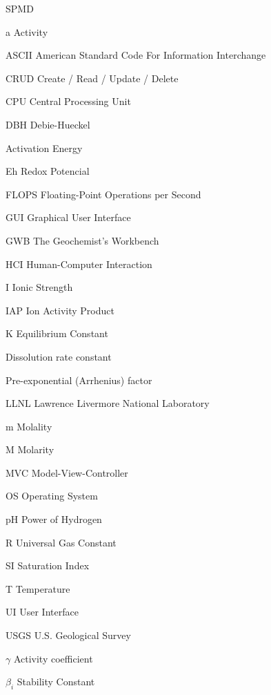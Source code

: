 \documentclass[ppgc,mestrado,english]{iiufrgs}
\begin{document}
\begin{listofabbrv}{SPMD}
\item[a] Activity
\item[ASCII] American Standard Code For Information Interchange
\item[CRUD] Create / Read / Update / Delete
\item[CPU] Central Processing Unit
\item[DBH] Debie-Hueckel 
\item[\ce{E_a}] Activation Energy
\item[Eh] Redox Potencial
\item[FLOPS] Floating-Point Operations per Second
\item[GUI] Graphical User Interface
\item[GWB] The Geochemist's Workbench
\item[HCI] Human-Computer Interaction        
\item[I] Ionic Strength
\item[IAP] Ion Activity Product 
\item[K] Equilibrium Constant        
\item[\ce{k_{diss}}] Dissolution rate constant
\item[\ce{k_0}] Pre-exponential (Arrhenius) factor
\item[LLNL] Lawrence Livermore National Laboratory
\item[m] Molality
\item[M] Molarity
\item[MVC] Model-View-Controller
\item[OS] Operating System
\item[pH] Power of Hydrogen
\item[R] Universal Gas Constant
\item[SI] Saturation Index 
\item[T] Temperature
\item[UI] User Interface
\item[USGS] U.S. Geological Survey
\item[$\gamma$] Activity coefficient
\item[$\beta_i$] Stability Constant         
\end{listofabbrv}


\end{document}
